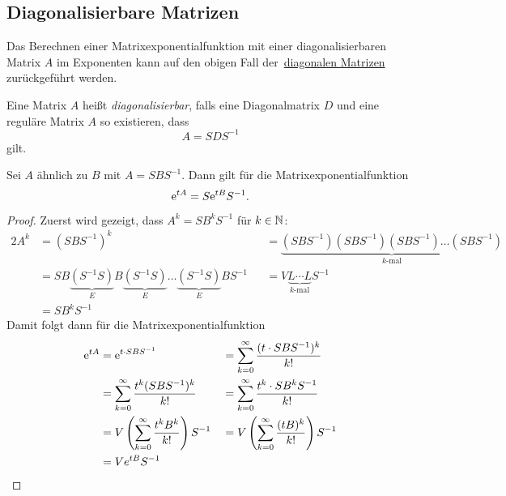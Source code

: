 \subsection{Diagonalisierbare Matrizen}\label{subsec:diagonalisierbare-matrizen}
Das Berechnen einer Matrixexponentialfunktion mit einer diagonalisierbaren Matrix $A$ im Exponenten
kann auf den obigen Fall der~\hyperref[subsec:diagonale-matrizen]{diagonalen Matrizen} zurückgeführt werden.

\begin{definition}[Wiederholung]
    Eine Matrix $A$ heißt \emph{diagonalisierbar}, falls eine Diagonalmatrix $D$ und eine reguläre Matrix $A$ so existieren, dass
    \begin{equation*}
        A = S D S^{-1}
    \end{equation*}
    gilt.
\end{definition}

\begin{lemma}\label{thm:matrixexponential-diagonalisierbar}
    Sei $A$ ähnlich zu $B$ mit $A = S B S^{-1}$.
    Dann gilt für die Matrixexponentialfunktion
    \begin{equation*}
        \mathrm{e}^{t A} = S \mathrm{e}^{t B} S^{-1}.
    \end{equation*}
\end{lemma}

\begin{proof}
    Zuerst wird gezeigt, dass $A^k = S B^k S^{-1}$ für $k \in \mathbb{N}$:
    \begin{alignat*}{2}
        A^k &= (S B S^{-1})^k &&= \underbrace{(S B S^{-1}) (S B S^{-1}) (S B S^{-1}) \dots (S B S^{-1})}_{k \text{-mal}}\\
            &= SB\underbrace{(S^{-1} S)}_{E} B \underbrace{(S^{-1} S)}_{E} \dots \underbrace{(S^{-1} S)}_{E} B S^{-1}
                &&= V \underbrace{L \cdots L}_{k \text{-mal}} S^{-1}\\
            &= S B^k S^{-1}
    \end{alignat*}
    Damit folgt dann für die Matrixexponentialfunktion
    \begin{alignat*}{2}
        \mathrm{e}^{t A} &= \mathrm{e}^{t \cdot S B S^{-1}} &&= \sum^\infty_{k=0} \frac{(t \cdot S B S^{-1})^k}{k!}\\
                 &= \sum^\infty_{k=0} \frac{t^k (S B S^{-1})^k}{k!} &&= \sum^\infty_{k=0} \frac{t^k \cdot S B^k S^{-1}}{k!}\\
                 &= V \left( \sum^\infty_{k=0} \frac{t^k B^k}{k!} \right) S^{-1} &&= V \left( \sum^\infty_{k=0} \frac{(t B)^k}{k!} \right) S^{-1}\\
                 &= V e^{t B} S^{-1}
    \end{alignat*}
\end{proof}

